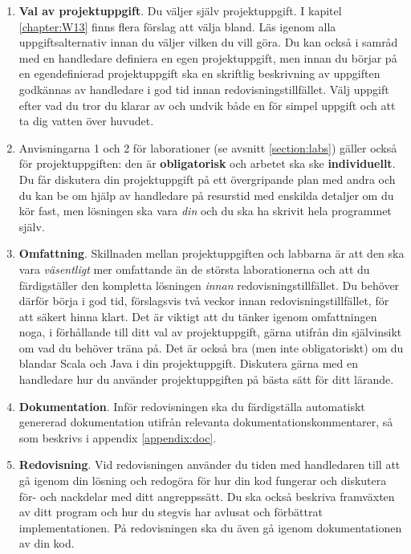 \begin{enumerate}
\item \textbf{Val av projektuppgift}.
Du väljer själv projektuppgift. I kapitel \ref{chapter:W13} finns flera förslag att välja bland. Läs igenom alla uppgiftsalternativ innan du väljer vilken du vill göra. Du kan också i samråd med en handledare definiera en egen projektuppgift, men innan du börjar på en egendefinierad projektuppgift ska en skriftlig beskrivning av uppgiften godkännas av handledare i god tid innan redovisningstillfället. Välj uppgift efter vad du tror du klarar av och undvik både en för simpel uppgift och att ta dig vatten över huvudet.

\item
Anvisningarna 1 och 2 för laborationer (se avsnitt \ref{section:labs}) gäller också för projektuppgiften: den är \textbf{obligatorisk} och arbetet ska ske \textbf{individuellt}.
Du får diskutera din projektuppgift på ett övergripande plan med andra och du kan be om hjälp av handledare på resurstid med enskilda detaljer om du kör fast, men lösningen ska vara \emph{din} och du ska ha skrivit hela programmet själv.


\item \textbf{Omfattning}.
Skillnaden mellan projektuppgiften och labbarna är att den ska vara \emph{väsentligt} mer omfattande än de största laborationerna och att du färdigställer den kompletta lösningen  \emph{innan} redovisningstillfället. Du behöver därför börja i god tid, förslagsvis två veckor innan redovisningstillfället, för att säkert hinna klart. Det är viktigt att du tänker igenom omfattningen noga, i förhållande till ditt val av projektuppgift, gärna utifrån din självinsikt om vad du behöver träna på. Det är också bra (men inte obligatoriskt) om du blandar Scala och Java i din projektuppgift. Diskutera gärna med en handledare hur du använder projektuppgiften på bästa sätt för ditt lärande.

\item \textbf{Dokumentation}. Inför redovisningen ska du färdigställa automatiskt genererad dokumentation utifrån relevanta dokumentationskommentarer, så som beskrivs i appendix \ref{appendix:doc}.

\item \textbf{Redovisning}.
Vid redovisningen använder du tiden med handledaren till att gå igenom din lösning och redogöra för hur din kod fungerar och diskutera för- och nackdelar med ditt angreppssätt. Du ska också beskriva framväxten av ditt program och hur du stegvis har avlusat och förbättrat implementationen. På redovisningen ska du även gå igenom dokumentationen av din kod.

\end{enumerate}


